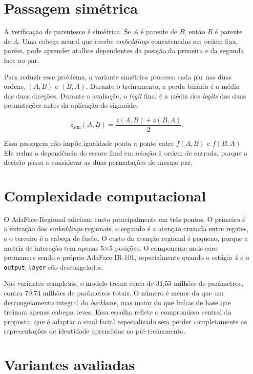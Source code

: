 \section{Passagem simétrica}

A verificação de parentesco é simétrica. Se $A$ é parente de $B$, então $B$ é parente de $A$. Uma cabeça neural que recebe \textit{embeddings} concatenados em ordem fixa, porém, pode aprender atalhos dependentes da posição da primeira e da segunda face no par.

Para reduzir esse problema, a variante simétrica processa cada par nas duas ordens, $(A,B)$ e $(B,A)$. Durante o treinamento, a perda binária é a média das duas direções. Durante a avaliação, o \textit{logit} final é a média dos \textit{logits} das duas permutações antes da aplicação do sigmoide.

\begin{equation}
z_{\text{sim}}(A,B) = \frac{z(A,B) + z(B,A)}{2}.
\label{eq:adaface_regional_simetrico}
\end{equation}

Essa passagem não impõe igualdade ponto a ponto entre $f(A,B)$ e $f(B,A)$. Ela reduz a dependência do escore final em relação à ordem de entrada, porque a decisão passa a considerar as duas permutações do mesmo par.

\section{Complexidade computacional}

O AdaFace-Regional adiciona custo principalmente em três pontos. O primeiro é a extração dos \textit{embeddings} regionais, o segundo é a atenção cruzada entre regiões, e o terceiro é a cabeça de fusão. O custo da atenção regional é pequeno, porque a matriz de interação tem apenas 5$\times$5 posições. O componente mais caro permanece sendo o próprio AdaFace IR-101, especialmente quando o estágio 4 e o \texttt{output\_layer} são descongelados.

Nas variantes completas, o modelo treina cerca de 31,55 milhões de parâmetros, contra 70,74 milhões de parâmetros totais. O número é menor do que um descongelamento integral do \textit{backbone}, mas maior do que linhas de base que treinam apenas cabeças leves. Essa escolha reflete o compromisso central da proposta, que é adaptar o sinal facial especializado sem perder completamente as representações de identidade aprendidas no pré-treinamento.

\section{Variantes avaliadas}

